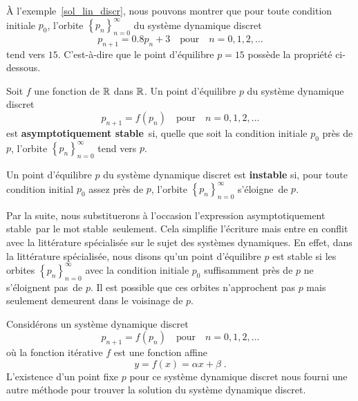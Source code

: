 {\begin{egg}
À l'exemple~\ref{sol_lin_discr}, nous pouvons montrer que pour toute
condition initiale $p_0$, l'orbite
$\displaystyle \left\{ p_n\right\}_{n=0}^\infty$ du 
système dynamique discret
\[
p_{n+1}=0.8 p_n +3 \quad \text{pour} \quad n=0, 1, 2, \ldots
\]
tend vers $15$.  C'est-à-dire que le point d'équilibre $p=15$ possède
la propriété ci-dessous.
\end{egg}

\begin{focus}{\dfn}
Soit $f$ une fonction de $\mathbb{R}$ dans $\mathbb{R}$.  Un point d'équilibre $p$ du
système dynamique discret
\[
p_{n+1} = f(p_n) \quad \text{pour} \quad n=0, 1, 2, \ldots
\]
est {\bfseries asymptotiquement stable}\footnotemark\ si, quelle que soit la
condition initiale $p_0$ près de $p$, l'orbite
$\displaystyle \left\{ p_n\right\}_{n=0}^\infty$ tend vers $p$.

Un point d'équilibre $p$ du système dynamique discret est
{\bfseries instable} si, pour toute condition initial $p_0$ assez près
de $p$, l'orbite $\displaystyle \left\{ p_n\right\}_{n=0}^\infty$
\lgm s'éloigne\rgm\ de $p$.
\end{focus}

\begin{rmk}
Par la suite, nous substituerons à l'occasion l'expression
\lgm asymptotiquement stable\rgm\ par le mot \lgm stable\rgm\
seulement.  Cela simplifie l'écriture mais entre en conflit
avec la littérature spécialisée sur le sujet des systèmes dynamiques.
En effet, dans la littérature spécialisée, nous disons qu'un point
d'équilibre $p$ est stable si les orbites
$\displaystyle \left\{ p_n\right\}_{n=0}^\infty$ avec la condition
initiale $p_0$ suffisamment près de $p$ \lgm ne s'éloignent pas\rgm\
de $p$.  Il est possible que ces orbites n'approchent pas $p$ mais
seulement demeurent dans le voisinage de $p$.  
\end{rmk}

Considérons un système dynamique discret
\[
p_{n+1}=f(p_n) \quad \text{pour} \quad n=0, 1, 2, \ldots
\]
où la fonction itérative $f$ est une fonction affine
\[
y = f(x) = \alpha x + \beta \; .
\]
L'existence d'un point fixe $p$ pour ce système dynamique discret nous
fourni une autre méthode pour trouver la solution du système dynamique
discret.

}
